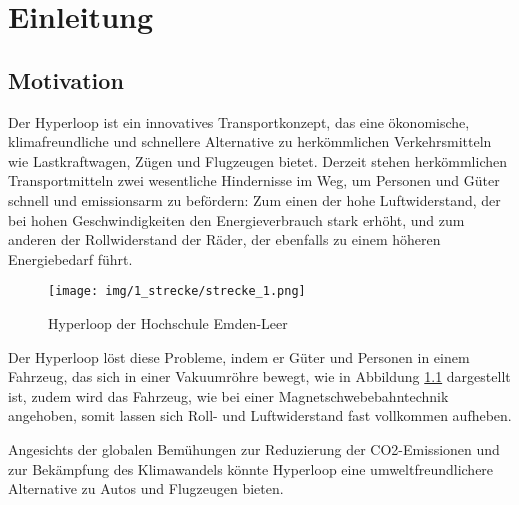 \chapter{Einleitung}
\label{chapter:Einleitung}

\section{Motivation}
\label{section:Motivation}

Der Hyperloop ist ein innovatives Transportkonzept, das eine ökonomische, klimafreundliche und schnellere Alternative zu herkömmlichen Verkehrsmitteln wie Lastkraftwagen, Zügen und Flugzeugen bietet.
Derzeit stehen herkömmlichen Transportmitteln zwei wesentliche Hindernisse im Weg, um Personen und Güter schnell und emissionsarm zu befördern: Zum einen der hohe Luftwiderstand, der bei hohen Geschwindigkeiten den Energieverbrauch stark erhöht, und zum anderen der Rollwiderstand der Räder, der ebenfalls zu einem höheren Energiebedarf führt.
\begin{figure}[!ht]
	\begin{center}
		\texttt{[image: img/1\_strecke/strecke\_1.png]}
		\caption{Hyperloop der Hochschule Emden-Leer}
		\label{img_1_1:strecke}
	\end{center}
\end{figure}
\pagebreak[1]


Der Hyperloop löst diese Probleme, indem er Güter und Personen in einem Fahrzeug, das sich in einer Vakuumröhre bewegt, wie in Abbildung \ref{img_1_1:strecke} dargestellt ist, zudem wird das Fahrzeug, wie bei einer Magnetschwebebahntechnik angehoben, somit lassen sich Roll- und Luftwiderstand fast vollkommen aufheben.

Angesichts der globalen Bemühungen zur Reduzierung der CO2-Emissionen und zur Bekämpfung des Klimawandels könnte Hyperloop eine umweltfreundlichere Alternative zu Autos und Flugzeugen bieten.





